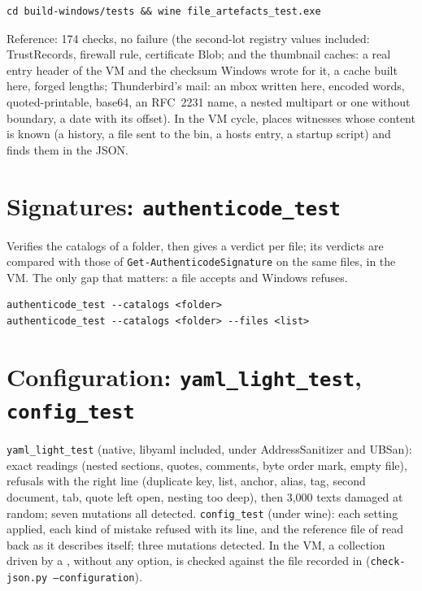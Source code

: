 \documentclass[11pt,a4paper,oneside]{report}
\begin{document}
\begin{lstlisting}
cd build-windows/tests && wine file_artefacts_test.exe
\end{lstlisting}

Reference: 174 checks, no failure (the second-lot registry values included: TrustRecords, firewall rule, certificate Blob; and the thumbnail caches: a real entry header of the VM and the checksum Windows wrote for it, a cache built here, forged lengths; Thunderbird's mail: an mbox written here, encoded words, quoted-printable, base64, an RFC~2231 name, a nested multipart or one without boundary, a date with its offset). In the VM cycle,
 places witnesses whose content is known (a
history, a file sent to the bin, a hosts entry, a startup script) and
 finds them in the JSON.

\section{Signatures: \texttt{authenticode\_test}}

Verifies the catalogs of a folder, then gives a verdict per file; its verdicts
are compared with those of \texttt{Get-AuthenticodeSignature} on the same files,
in the VM. The only gap that matters: a file \wac{} accepts and Windows refuses.

\begin{lstlisting}
authenticode_test --catalogs <folder>
authenticode_test --catalogs <folder> --files <list>
\end{lstlisting}

\section{Configuration: \texttt{yaml\_light\_test}, \texttt{config\_test}}

\texttt{yaml\_light\_test} (native, libyaml included, under AddressSanitizer
and UBSan): exact readings (nested sections, quotes, comments, byte order
mark, empty file), refusals with the right line (duplicate key, list, anchor,
alias, tag, second document, tab, quote left open, nesting too deep), then
3,000 texts damaged at random; seven mutations all detected.
\texttt{config\_test} (under wine): each setting applied, each kind of mistake
refused with its line, and the reference file of  read back
as it describes itself; three mutations detected. In the VM, a collection
driven by a , without any option, is checked against the file
recorded in  (\texttt{check-json.py
--configuration}).
\end{document}
